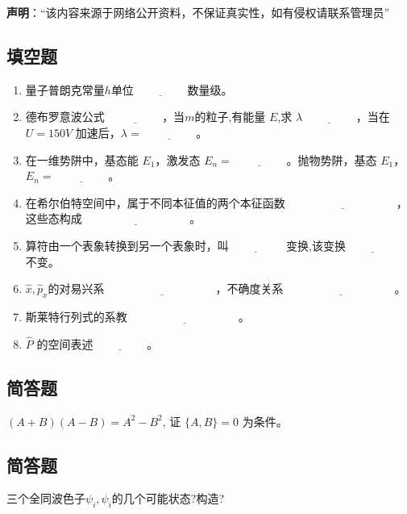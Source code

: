 
\textbf{声明}：“该内容来源于网络公开资料，不保证真实性，如有侵权请联系管理员”

\subsection{填空题}
\begin{enumerate}
    \item 量子普朗克常量$h$单位$\underline{\hspace{2cm}}$数量级。
    \item 德布罗意波公式 $\underline{\hspace{2cm}}$，当$m$的粒子,有能量 $E$,求 $\lambda\underline{\hspace{2cm}}$，当在 $U = 150V$ 加速后，$\lambda = \underline{\hspace{2cm}}$。
    \item 在一维势阱中，基态能 $E_1$，激发态 $E_n = \underline{\hspace{2cm}}$。抛物势阱，基态 $E_1$，$E_n = \underline{\hspace{2cm}}$。
    \item 在希尔伯特空间中，属于不同本征值的两个本征函数 $\underline{\hspace{4cm}}$，这些态构成$\underline{\hspace{4cm}}$。
    \item 算符由一个表象转换到另一个表象时，叫$\underline{\hspace{2cm}}$ 变换,该变换$\underline{\hspace{2cm}}$ 不变。
    \item $\hat x,\hat p_x$的对易兴系 $\underline{\hspace{4cm}}$，不确度关系 $\underline{\hspace{4cm}}$。
    \item 斯莱特行列式的系教 $\underline{\hspace{4cm}}$。
    \item $\hat P$ 的空间表述$\underline{\hspace{2cm}}$。
\end{enumerate}
\subsection{简答题}
 $(A+B)(A-B) = A^2 - B^2$, 证 $\{A, B\} = 0$ 为条件。
\subsection{简答题}
三个全同波色子$\psi_i,\psi_i$的几个可能状态?构造?
